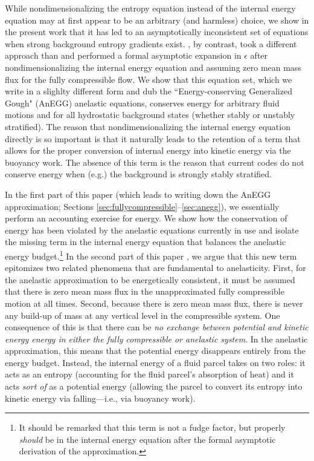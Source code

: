 \documentclass[12pt]{article}
\begin{document}
	While nondimensionalizing the entropy equation instead of the internal energy equation may at first appear to be an arbitrary (and harmless) choice, we show in the present work that it has led to an asymptotically inconsistent set of equations when strong background entropy gradients exist. \citet{Gough1969}, by contrast, took a different approach than \citet{Ogura1962} and performed a formal asymptotic expansion in $\epsilon$ after nondimensionalizing the internal energy equation and assuming zero mean mass flux for the fully compressible flow. We show that this equation set, which we write in a slighlty different form and dub the ``Energy-conserving Generalized Gough" (AnEGG) anelastic equations, conserves energy for arbitrary fluid motions and for all hydrostatic background states (whether stably or unstably stratified). The reason that nondimensionalizing the internal energy equation directly is so important is that it naturally leads to the retention of a term that allows for the proper conversion of internal energy into kinetic energy via the buoyancy work. The absence of this term is the reason that current codes do not conserve energy when (e.g.) the background is strongly stably stratified. 
	
	In the first part of this paper (which leads to writing down the AnEGG approximation; Sections \ref{sec:fullycompressible}--\ref{sec:anegg}), we essentially perform an accounting exercise for energy. We show how the conservation of energy has been violated by the anelastic equations currently in use and isolate the missing term in the internal energy equation that balances the anelastic energy budget.\footnote{It should be remarked that this term is not a fudge factor, but properly \textit{should} be in the internal energy equation after the formal asymptotic derivation of the approximation.} In the second part of this paper , we argue that this new term epitomizes two related phenomena that are fundamental to anelasticity. First, for the anelastic approximation to be energetically consistent, it must be assumed that there is zero mean mass flux in the unapproximated fully compressible motion at all times. Second, because there is zero mean mass flux, there is never any build-up of mass at any vertical level in the compressible system. One consequence of this is that there can be \textit{no exchange between potential and kinetic energy energy in either the fully compressible or anelastic system}. In the anelastic approximation, this means that the potential energy disappears entirely from the energy budget. Instead, the internal energy of a fluid parcel takes on two roles: it acts as an entropy (accounting for the fluid parcel's absorption of heat) and it acts \textit{sort of} as a potential energy (allowing the parcel to convert its entropy into kinetic energy via falling---i.e., via buoyancy work). 
	
\end{document}
